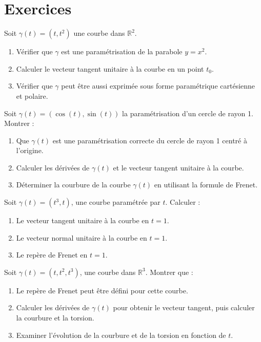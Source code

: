 \section{Exercices}
\begin{exercice}
Soit \( \gamma(t) = (t, t^2) \) une courbe dans \( \mathbb{R}^2 \).
\begin{enumerate}
    \item Vérifier que \( \gamma \) est une paramétrisation de la parabole \( y = x^2 \).
    \item Calculer le vecteur tangent unitaire à la courbe en un point \( t_0 \).
    \item Vérifier que \( \gamma \) peut être aussi exprimée sous forme paramétrique cartésienne et polaire.
\end{enumerate}
\end{exercice}

\begin{exercice}
Soit \( \gamma(t) = (\cos(t), \sin(t)) \) la paramétrisation d'un cercle de rayon 1. Montrer :
\begin{enumerate}
    \item Que \( \gamma(t) \) est une paramétrisation correcte du cercle de rayon 1 centré à l'origine.
    \item Calculer les dérivées de \( \gamma(t) \) et le vecteur tangent unitaire à la courbe.
    \item Déterminer la courbure de la courbe \( \gamma(t) \) en utilisant la formule de Frenet.
\end{enumerate}
\end{exercice}

\begin{exercice}
Soit \( \gamma(t) = (t^3, t) \), une courbe paramétrée par \( t \). Calculer :
\begin{enumerate}
    \item Le vecteur tangent unitaire à la courbe en \( t = 1 \).
    \item Le vecteur normal unitaire à la courbe en \( t = 1 \).
    \item Le repère de Frenet en \( t = 1 \).
\end{enumerate}
\end{exercice}

\begin{exercice}
Soit \( \gamma(t) = (t, t^2, t^3) \), une courbe dans \( \mathbb{R}^3 \). Montrer que :
\begin{enumerate}
    \item Le repère de Frenet peut être défini pour cette courbe.
    \item Calculer les dérivées de \( \gamma(t) \) pour obtenir le vecteur tangent, puis calculer la courbure et la torsion.
    \item Examiner l'évolution de la courbure et de la torsion en fonction de \( t \).
\end{enumerate}
\end{exercice}


